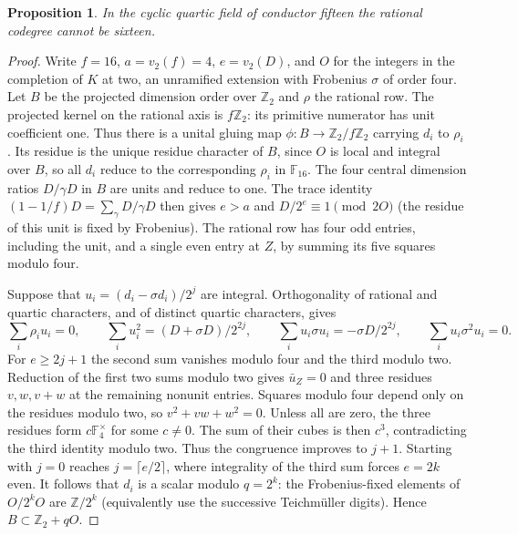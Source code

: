 \documentclass[11pt,a4paper]{article}
\newtheorem{proposition}[theorem]{Proposition}
\numberwithin{equation}{section}
\begin{document}
\begin{proposition}\label{prop:quartic-dyadic-depth}
In the cyclic quartic field of conductor fifteen the rational codegree cannot be sixteen.
\end{proposition}
\begin{proof}
Write $f=16$, $a=v_2(f)=4$, $e=v_2(D)$, and $O$ for the integers in the completion of $K$ at two, an unramified extension with Frobenius $\sigma$ of order four. Let $B$ be the projected dimension order over $\mathbb Z_2$ and $\rho$ the rational row. The projected kernel on the rational axis is $f\mathbb Z_2$: its primitive numerator has unit coefficient one. Thus there is a unital gluing map $\phi:B\to\mathbb Z_2/f\mathbb Z_2$ carrying $d_i$ to $\rho_i$. Its residue is the unique residue character of $B$, since $O$ is local and integral over $B$, so all $d_i$ reduce to the corresponding $\rho_i$ in $\mathbb F_{16}$. The four central dimension ratios $D/\gamma D$ in $B$ are units and reduce to one. The trace identity $(1-1/f)D=\sum_\gamma D/\gamma D$ then gives $e>a$ and $D/2^e\equiv1\pmod{2O}$ (the residue of this unit is fixed by Frobenius). The rational row has four odd entries, including the unit, and a single even entry at $Z$, by summing its five squares modulo four.

Suppose that $u_i=(d_i-\sigma d_i)/2^j$ are integral. Orthogonality of rational and quartic characters, and of distinct quartic characters, gives
\[
 \sum_i\rho_i u_i=0,\qquad
 \sum_i u_i^2=(D+\sigma D)/2^{2j},\qquad
 \sum_i u_i\sigma u_i=-\sigma D/2^{2j},\qquad
 \sum_i u_i\sigma^2u_i=0.
\]
For $e\ge2j+1$ the second sum vanishes modulo four and the third modulo two. Reduction of the first two sums modulo two gives $\bar u_Z=0$ and three residues $v,w,v+w$ at the remaining nonunit entries. Squares modulo four depend only on the residues modulo two, so $v^2+vw+w^2=0$. Unless all are zero, the three residues form $c\mathbb F_4^\times$ for some $c\ne0$. The sum of their cubes is then $c^3$, contradicting the third identity modulo two. Thus the congruence improves to $j+1$. Starting with $j=0$ reaches $j=\lceil e/2\rceil$, where integrality of the third sum forces $e=2k$ even. It follows that $d_i$ is a scalar modulo $q=2^k$: the Frobenius-fixed elements of $O/2^kO$ are $\mathbb Z/2^k$ (equivalently use the successive Teichm\"uller digits). Hence $B\subset\mathbb Z_2+qO$.


\end{proof}
\end{document}

